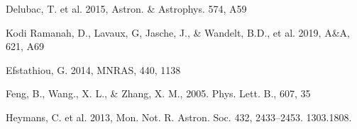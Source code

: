 \documentclass[twocolumn]{aastex61}
\begin{document}
\begin{thebibliography}{}
Delubac, T. et al. 2015, Astron. \& Astrophys. 574, A59

Kodi Ramanah, D., Lavaux, G, Jasche, J., \& Wandelt, B.D., et al. 2019, 
A\&A, 621, A69
 

 
Efstathiou, G. 2014, MNRAS, 440, 1138



Feng, B., Wang., X. L., \& Zhang, X. M., 2005. Phys. Lett. B., 607, 35












Heymans, C. et al. 2013, Mon. Not. R. Astron. Soc. 432,
2433–2453. 1303.1808.


\end{thebibliography}
\end{document}
